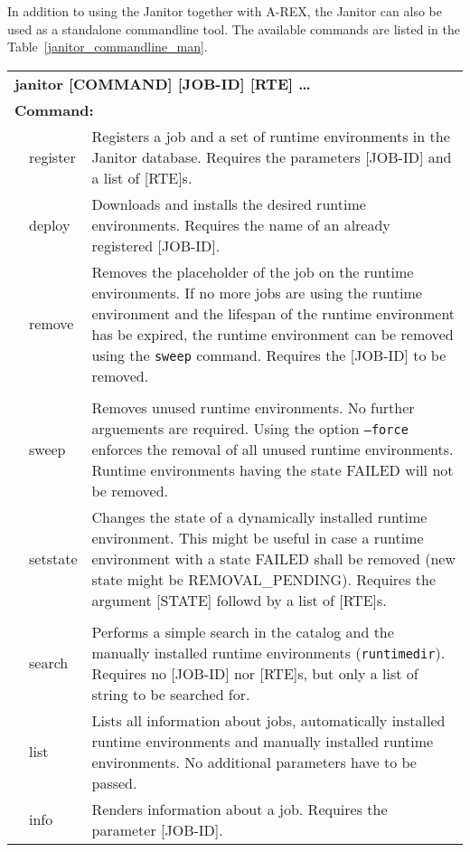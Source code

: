 In addition to using the Janitor together with A-REX, the Janitor can also be used as a standalone commandline tool.
The available commands are listed in the Table~\ref{janitor_commandline_man}.
\begin{table}[!h]
   \begin{center}
        \label{tab:janitor_commandline_man}
	\begin{tabular}{p{0.5cm}p{2cm}p{11cm}}
	\multicolumn{3}{l}{\textbf{janitor [COMMAND] [JOB-ID] [RTE] \dots}} \\
	\multicolumn{3}{l}{\textbf{Command:}}\\
	&	register			& Registers a job and a set of runtime environments in the Janitor database. Requires the parameters [JOB-ID] and a list of [RTE]s.\\
	&	deploy				& Downloads and installs the desired runtime environments. Requires the name of an already registered [JOB-ID].\\
	&	remove				& Removes the placeholder of the job on the runtime environments. If no more jobs are using the runtime environment and the lifespan of the runtime environment has be expired, the runtime environment can be removed using the \texttt{sweep} command. Requires the [JOB-ID] to be removed.\\
	&					&\\
	&	sweep				& Removes unused runtime environments. No further arguements are required. Using the option \texttt{--force} enforces the removal of all unused runtime environments. Runtime environments having the state FAILED will not be removed.\\
	&	setstate			& Changes the state of a dynamically installed runtime environment. This might be useful in case a runtime environment with a state FAILED shall be removed (new state might be REMOVAL\_PENDING). Requires the argument [STATE] followd by a list of [RTE]s.\\
	&					&\\
	&	search				& Performs a simple search in the catalog and the manually installed runtime environments (\texttt{runtimedir}). Requires no [JOB-ID] nor [RTE]s, but only a list of string to be searched for.\\
	&	list				& Lists all information about jobs, automatically installed runtime environments and manually installed runtime environments. No additional parameters have to be passed.\\
	&	info				& Renders information about a job. Requires the parameter [JOB-ID].\\

\end{tabular}
\end{center}
\end{table}
